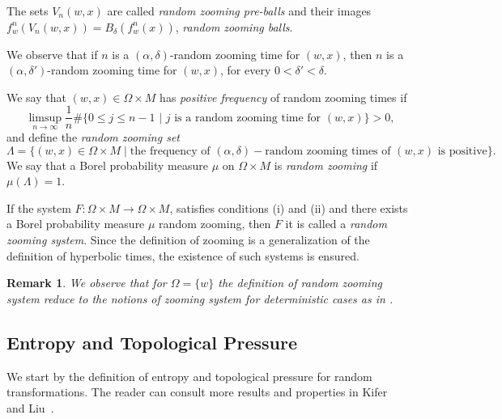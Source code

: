 \documentclass[12pt,a4paper]{amsart}
\theoremstyle{plain}
\newtheorem{remark}{Remark}
\begin{document}
	The sets $V_{n}(w,x)$ are called \textit{random zooming pre-balls} and their images $f^{n}_{w}(V_{n}(w,x)) = B_{\delta}(f^{n}_{w}(x))$,  \textit{random zooming balls}.
	
	We observe that if $n$ is a $(\alpha,\delta)$-random zooming time for $(w,x)$, then $n$ is a $(\alpha,\delta')$-random zooming time for $(w,x)$, for every $0 < \delta' < \delta$.
	
	We say that $(w,x) \in \Omega \times M$ has {\textit{positive frequency}} of random zooming times if
	\begin{equation}
		\limsup_{n \to \infty}\frac{1}{n}\# \bigg\{0 \leq j \leq n-1 \,\, | \,\, j \,\, \text{is a random zooming time for} \,\, (w,x)\bigg\} > 0,
	\end{equation}\label{frequency}
	and define the {\textit{random zooming set}}
	$$
	\Lambda = \{(w,x) \in \Omega \times M \mid \text{the frequency of} \,\, (\alpha,\delta)- \text{random zooming times of} \,\, (w,x) \,\, \text{is positive}\}.
	$$
	We say that a Borel probability  measure $\mu$ on $\Omega \times M$ is {\textit{random zooming}} if $\mu(\Lambda)=1$.
	
	
	If the system $F:\Omega\times M \rightarrow \Omega \times M$, satisfies conditions (i) and (ii) and there exists a Borel probability measure $\mu$ random zooming, then $F$ it is called a {\it random zooming system}. Since the definition of zooming is a generalization of the definition of hyperbolic times, the existence of such systems is ensured.
	
	\begin{remark} We observe that for $\Omega=\{w\}$ the definition of random zooming system reduce to the notions of zooming system for deterministic cases as in \cite{Pi1}.
	\end{remark}
	
	
	\subsection{Entropy and Topological Pressure}
	We start by the definition of entropy and topological pressure for random transformations. The reader can consult more results and properties in Kifer~\cite{K} and Liu~\cite{L}.
	
\end{document}
